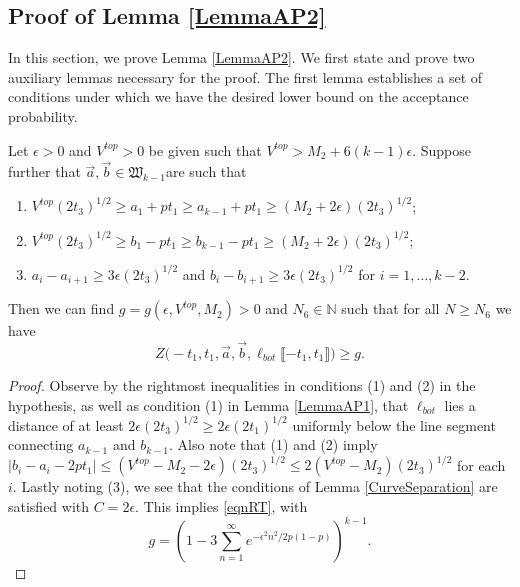 \subsection{Proof of Lemma \ref{LemmaAP2}} \label{sect62} In this section, we prove Lemma \ref{LemmaAP2}. We first state and prove two auxiliary lemmas necessary for the proof. The first lemma establishes a set of conditions under which we have the desired lower bound on the acceptance probability. 

\begin{lemma}\label{LemmaBP1} Let $\epsilon > 0$ and $V^{top} > 0$ be given such that $V^{top} > M_2 + 6 (k-1) \epsilon$. Suppose further that $\vec{a}, \vec{b} \in \mathfrak{W}_{k-1}$are such that 
	\begin{enumerate}
		\item $V^{top} (2t_3)^{1/2} \geq a_1 + p t_1 \geq a_{k-1} + pt_1 \geq (M_2 + 2 \epsilon) (2t_3)^{1/2}$;
		\item $V^{top} (2t_3)^{1/2} \geq b_1 - p t_1 \geq b_{k-1} - pt_1 \geq (M_2 + 2 \epsilon) (2t_3)^{1/2}$; 
		\item $a_i -a_{i+1} \geq 3\epsilon (2t_3)^{1/2}$ and $b_{i} - b_{i+1} \geq 3 \epsilon (2t_3)^{1/2}$ for $i = 1, \dots, k-2$.
	\end{enumerate}
	Then we can find $g = g(\epsilon, V^{top}, M_2) > 0$ and $N_6 \in \mathbb{N}$ such that for all $N \geq N_6$ we have 
	\begin{equation}\label{eqnRT}
	Z\big(  -t_1, t_1, \vec{a} ,\vec{b}, \ell_{bot}\llbracket -t_1, t_1\rrbracket\big) \geq g.
	\end{equation}
\end{lemma}

\begin{proof}
	
	Observe by the rightmost inequalities in conditions (1) and (2) in the hypothesis, as well as condition (1) in Lemma \ref{LemmaAP1}, that $\ell_{bot}$ lies a distance of at least $2\epsilon(2t_3)^{1/2} \geq 2\epsilon(2t_1)^{1/2}$ uniformly below the line segment connecting $a_{k-1}$ and $b_{k-1}$. Also note that (1) and (2) imply $|b_i-a_i-2pt_1| \leq (V^{top} - M_2-2\epsilon)(2t_3)^{1/2} \leq 2(V^{top} - M_2)(2t_3)^{1/2}$ for each $i$. Lastly noting (3), we see that the conditions of Lemma \ref{CurveSeparation} are satisfied with $C = 2\epsilon$. This implies \eqref{eqnRT}, with
	\[
	g = \left( 1 - 3\sum_{n=1}^\infty e^{-\epsilon^2n^2/2p(1-p)}\right)^{k-1}.
	\]
	
\end{proof}


